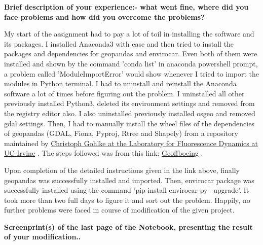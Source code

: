 \documentclass[11pt]{article}
\begin{document}
\textbf{Brief description of your experience:- what went fine, where did you
face problems and how did you overcome the problems?}

    My start of the assignment had to pay a lot of toil in installing the software and its packages. I installed Anaconda3 with ease and then tried to install the packages and dependencies for geopandas and envirocar. Even both of them were installed and shown by the command 'conda list' in anaconda powershell prompt, a problem called 'ModuleImportError' would show whenever I tried to import the modules in Python terminal. I had to uninstall and reinstall the Anaconda software a lot of times before figuring out the problem. I uninstalled all other previously installed Python3, deleted its environment settings and removed from the registry editor also. I also uninstalled previously installed osgeo and removed gdal settings. Then, I had to manually install the wheel files of the dependencies of geopandas (GDAL, Fiona, Pyproj, Rtree and Shapely) from a repository maintained by \href{https://www.lfd.uci.edu/~gohlke/pythonlibs/}{Christoph Gohlke at the Laboratory for Fluorescence Dynamics at UC Irvine} . The steps followed was from this link: \href{https://geoffboeing.com/2014/09/using-geopandas-windows/?fbclid=IwAR1c1qrPEm0QmVnvl4drel7aZ\_pU\_Bh\_QN-1Z8QxzhY0RNBWXeApJpBVZ-Y}{Geoffboeing} .

    Upon completion of the detailed instructions given in the link above, finally geopandas was successfully installed and imported. Then, envirocar package was successfully installed using the command 'pip install envirocar-py --upgrade'. It took more than two full days to figure it and sort out the problem. 
    Happily, no further problems were faced in course of modification of the given project.


\textbf{Screenprint(s) of the last page of the Notebook, presenting the
result of your modification..}
\end{document}
